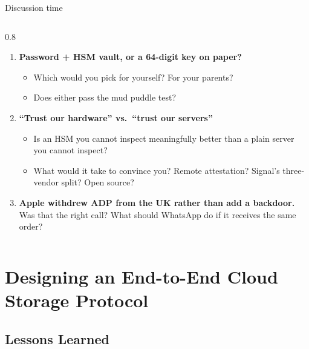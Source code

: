 \ifdefined\PRESENTATION\else\PassOptionsToClass{handout}{beamer}\fi\documentclass[aspectratio=169, lualatex]{beamer}
\begin{document}
\begin{frame}{Discussion time}
	\begin{columns}[c]
		\begin{column}{0.8\textwidth}
			\begin{enumerate}
				\item \textbf{Password + HSM vault, or a 64-digit key on paper?}
				      \begin{itemize}
					      \item Which would you pick for yourself? For your parents?
					      \item Does either pass the mud puddle test?
				      \end{itemize}
				\item \textbf{``Trust our hardware'' vs.\ ``trust our servers''}
				      \begin{itemize}
					      \item Is an HSM you cannot inspect meaningfully better than a plain server you cannot inspect?
					      \item What would it take to convince you? Remote attestation? Signal's three-vendor split? Open source?
				      \end{itemize}
				\item \textbf{Apple withdrew ADP from the UK rather than add a backdoor.} Was that the right call? What should WhatsApp do if it receives the same order?
			\end{enumerate}
		\end{column}
	\end{columns}
\end{frame}

\section{Designing an End-to-End Cloud Storage Protocol}

\subsection{Lessons Learned}
\end{document}
